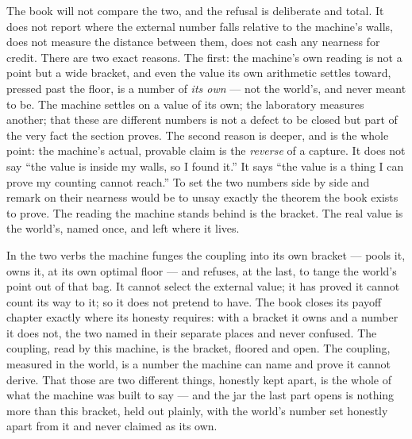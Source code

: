 The book will not compare the two, and the refusal is deliberate and total. It does not report where the external number
falls relative to the machine's walls, does not measure the distance between them, does not cash any nearness for credit.
There are two exact reasons. The first: the machine's own reading is not a point but a wide bracket, and even the value
its own arithmetic settles toward, pressed past the floor, is a number of \emph{its own} --- not the world's, and never
meant to be. The machine settles on a value of its own; the laboratory measures another; that these are different numbers
is not a defect to be closed but part of the very fact the section proves. The second reason is deeper, and is the whole
point: the machine's actual, provable claim is the \emph{reverse} of a capture. It does not say ``the value is inside my
walls, so I found it.'' It says ``the value is a thing I can prove my counting cannot reach.'' To set the two numbers side
by side and remark on their nearness would be to unsay exactly the theorem the book exists to prove. The reading the
machine stands behind is the bracket. The real value is the world's, named once, and left where it lives.

In the two verbs the machine funges the coupling into its own bracket --- pools it, owns it, at its own optimal floor ---
and refuses, at the last, to tange the world's point out of that bag. It cannot select the external value; it has proved
it cannot count its way to it; so it does not pretend to have. The book closes its payoff chapter exactly where its
honesty requires: with a bracket it owns and a number it does not, the two named in their separate places and never
confused. The coupling, read by this machine, is the bracket, floored and open. The
coupling, measured in the world, is a number the machine can name and prove it cannot derive. That those are two
different things, honestly kept apart, is the whole of what the machine was built to say --- and the jar the last part
opens is nothing more than this bracket, held out plainly, with the world's number set honestly apart from it and never
claimed as its own.
